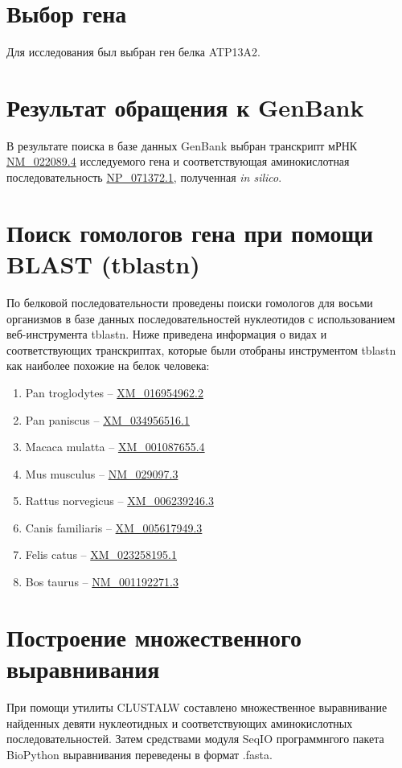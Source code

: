 \documentclass[a4paper,12pt]{article} %
\begin{document}
	
	
	\section{Выбор гена}
	Для исследования был выбран ген белка ATP13A2.
	\section{Результат обращения к GenBank}
	В результате поиска в базе данных GenBank выбран транскрипт мРНК \href{https://www.ncbi.nlm.nih.gov/nuccore/NM_022089.4}{NM\_022089.4} исследуемого гена и соответствующая аминокислотная последовательность \href{https://www.ncbi.nlm.nih.gov/protein/13435129}{NP\_071372.1}, полученная \textit{in silico}.
	\section{Поиск гомологов гена при помощи BLAST (tblastn)}
	По белковой последовательности проведены поиски гомологов для восьми организмов в базе данных последовательностей нуклеотидов с использованием веб-инструмента tblastn. Ниже приведена информация о видах и соответствующих транскриптах, которые были отобраны инструментом tblastn как наиболее похожие на белок человека:
	\begin{enumerate}
		\item Pan troglodytes -- \href{https://www.ncbi.nlm.nih.gov/nuccore/XM_016954962.2}{XM\_016954962.2} 
		\item Pan paniscus -- \href{https://www.ncbi.nlm.nih.gov/nuccore/XM_034956516.1}{XM\_034956516.1} 
		\item Macaca mulatta -- \href{https://www.ncbi.nlm.nih.gov/nuccore/XM_001087655.4}{XM\_001087655.4}
		\item Mus musculus -- \href{https://www.ncbi.nlm.nih.gov/nuccore/NM_029097.3}{NM\_029097.3}
		\item Rattus norvegicus -- \href{https://www.ncbi.nlm.nih.gov/nuccore/XM_006239246.3}{XM\_006239246.3}
		\item Canis familiaris -- \href{https://www.ncbi.nlm.nih.gov/nuccore/XM_005617949.3}{XM\_005617949.3}
		\item Felis catus -- \href{https://www.ncbi.nlm.nih.gov/nuccore/XM_023258195.1}{XM\_023258195.1}
		\item Bos taurus -- \href{https://www.ncbi.nlm.nih.gov/nuccore/NM_001192271.3}{NM\_001192271.3}
	\end{enumerate}
	\section{Построение множественного выравнивания}
	При помощи утилиты CLUSTALW составлено множественное выравнивание найденных девяти нуклеотидных и соответствующих аминокислотных последовательностей. Затем средствами модуля SeqIO программнгого пакета BioPython выравнивания переведены в формат .fasta.
\end{document}
